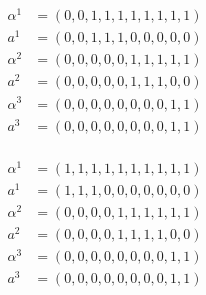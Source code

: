 \documentclass[11pt]{article}
\begin{document}
    \begin{align*}
        \alpha^1 &= (0,0,1,1,1,1,1,1,1,1)\\
        a^1 &=      (0,0,1,1,1,0,0,0,0,0)\\
        \alpha^2 &= (0,0,0,0,0,1,1,1,1,1)\\
        a^2 &=      (0,0,0,0,0,1,1,1,0,0)\\
        \alpha^3 &= (0,0,0,0,0,0,0,0,1,1)\\
        a^3 &=      (0,0,0,0,0,0,0,0,1,1)\\
    \end{align*}

    \begin{align*}
        \alpha^1 &= (1,1,1,1,1,1,1,1,1,1)\\
        a^1 &=      (1,1,1,0,0,0,0,0,0,0)\\
        \alpha^2 &= (0,0,0,0,1,1,1,1,1,1)\\
        a^2 &=      (0,0,0,0,1,1,1,1,0,0)\\
        \alpha^3 &= (0,0,0,0,0,0,0,0,1,1)\\
        a^3 &=      (0,0,0,0,0,0,0,0,1,1)\\
    \end{align*}
  
\end{document}
